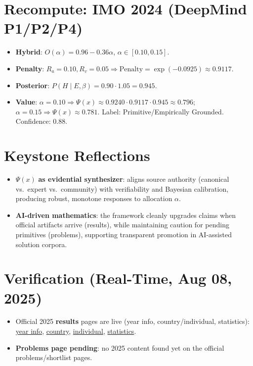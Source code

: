 \documentclass[11pt]{article}
\newcommand{\Px}{\Psi(x)}
\newcommand{\post}{P(H\mid E,\beta)}
\newcommand{\pen}{\mathrm{Penalty}}
\begin{document}
\section{Recompute: IMO 2024 (DeepMind P1/P2/P4)}
\begin{itemize}[leftmargin=1.2em]
  \item \textbf{Hybrid}: $O(\alpha)=0.96-0.36\alpha$, $\alpha\in[0.10,0.15]$.
  \item \textbf{Penalty}: $R_a{=}0.10,R_v{=}0.05\Rightarrow \pen=\exp(-0.0925)\approx 0.9117$.
  \item \textbf{Posterior}: $\post=0.90\cdot 1.05=0.945$.
  \item \textbf{Value}: $\alpha{=}0.10\Rightarrow \Px\approx 0.9240\cdot 0.9117\cdot 0.945\approx \mathbf{0.796}$;
        $\alpha{=}0.15\Rightarrow \Px\approx \mathbf{0.781}$.
        Label: Primitive/Empirically Grounded. Confidence: 0.88.
\end{itemize}
\section{Keystone Reflections}
\begin{itemize}[leftmargin=1.2em]
  \item $\Px$ \textbf{as evidential synthesizer}: aligns source authority (canonical vs.\ expert vs.\ community) with verifiability and Bayesian calibration, producing robust, monotone responses to allocation $\alpha$.
  \item \textbf{AI-driven mathematics}: the framework cleanly upgrades claims when official artifacts arrive (results), while maintaining caution for pending primitives (problems), supporting transparent promotion in AI-assisted solution corpora.
\end{itemize}
\section{Verification (Real-Time, Aug 08, 2025)}
\begin{itemize}[leftmargin=1.2em]
  \item Official 2025 \textbf{results} pages are live (year info, country/individual, statistics):
  \href{https://imo-official.org/year_info.aspx?year=2025}{year info},
  \href{https://imo-official.org/year_country_r.aspx?year=2025}{country},
  \href{https://imo-official.org/year_individual_r.aspx?year=2025}{individual},
  \href{https://imo-official.org/year_statistics.aspx?year=2025}{statistics}.
  \item \textbf{Problems page pending}: no 2025 content found yet on the official problems/shortlist pages.
\end{itemize}
\end{document}
